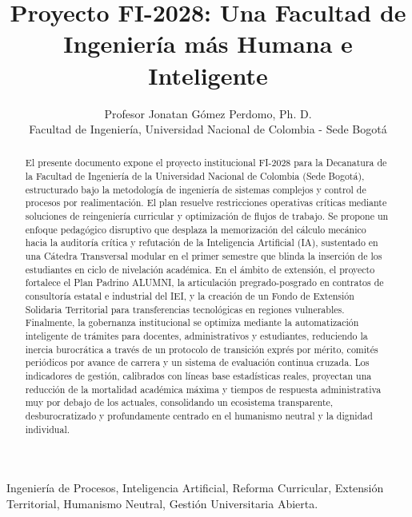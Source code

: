 \documentclass[journal,10pt,twocolumn,letterpaper]{IEEEtran}
\begin{document}
\title{Proyecto FI-2028: Una Facultad de Ingeniería más Humana e Inteligente}

\author{Profesor Jonatan Gómez Perdomo, Ph. D. \\
Facultad de Ingeniería, Universidad Nacional de Colombia - Sede Bogotá}

\maketitle

\begin{abstract}
El presente documento expone el proyecto institucional FI-2028 para la Decanatura de la Facultad de Ingeniería de la Universidad Nacional de Colombia (Sede Bogotá), estructurado bajo la metodología de ingeniería de sistemas complejos y control de procesos por realimentación. El plan resuelve restricciones operativas críticas mediante soluciones de reingeniería curricular y optimización de flujos de trabajo. Se propone un enfoque pedagógico disruptivo que desplaza la memorización del cálculo mecánico hacia la auditoría crítica y refutación de la Inteligencia Artificial (IA), sustentado en una Cátedra Transversal modular en el primer semestre que blinda la inserción de los estudiantes en ciclo de nivelación académica. En el ámbito de extensión, el proyecto fortalece el Plan Padrino ALUMNI, la articulación pregrado-posgrado en contratos de consultoría estatal e industrial del IEI, y la creación de un Fondo de Extensión Solidaria Territorial para transferencias tecnológicas en regiones vulnerables. Finalmente, la gobernanza institucional se optimiza mediante la automatización inteligente de trámites para docentes, administrativos y estudiantes, reduciendo la inercia burocrática a través de un protocolo de transición exprés por mérito, comités periódicos por avance de carrera y un sistema de evaluación continua cruzada. Los indicadores de gestión, calibrados con líneas base estadísticas reales, proyectan una reducción de la mortalidad académica máxima y tiempos de respuesta administrativa muy por debajo de los actuales, consolidando un ecosistema transparente, desburocratizado y profundamente centrado en el humanismo neutral y la dignidad individual.
\end{abstract}

\begin{IEEEkeywords}
Ingeniería de Procesos, Inteligencia Artificial, Reforma Curricular, Extensión Territorial, Humanismo Neutral, Gestión Universitaria Abierta.
\end{IEEEkeywords}
\end{document}
